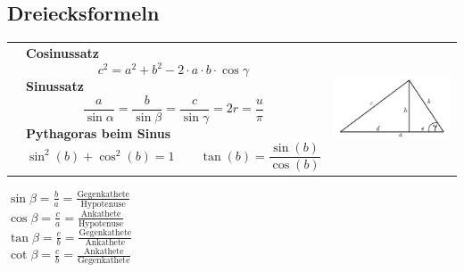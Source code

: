 \subsection{Dreiecksformeln}
\begin{tabular}{lll}
	& \parbox{9.5cm}{
		\textbf{Cosinussatz} \\
		$$c^2 = a^2 + b^2 - 2 \cdot a \cdot b \cdot \cos \gamma$$\\
		\textbf{Sinussatz} \\
		$$\frac{a}{\sin \alpha} = \frac{b}{\sin \beta} = \frac{c}{\sin \gamma} = 2r =
		\frac{u}{\pi}$$
		\textbf{Pythagoras beim Sinus}\\
		$$\sin^2(b)+\cos^2(b)=1 \qquad \tan(b)=\frac{\sin(b)}{\cos(b)}$$}
		
	& \parbox{8cm}{
		\includegraphics[width=6cm]{sections/idiotenseite/images/cosinussatz.png}}
\end{tabular}
\begin{center}
	\begin{multicols}{2}
		$\sin \beta = \frac ba =\frac{\text{Gegenkathete}}{\text{Hypotenuse}}$\\
		$\cos \beta = \frac ca =\frac{\text{Ankathete}}{\text{Hypotenuse}}$\\
		$\tan \beta = \frac cb =\frac{\text{Gegenkathete}}{\text{Ankathete}}$\\
		$\cot \beta = \frac cb =\frac{\text{Ankathete}}{\text{Gegenkathete}}$\\
	\end{multicols}
\end{center}

	
